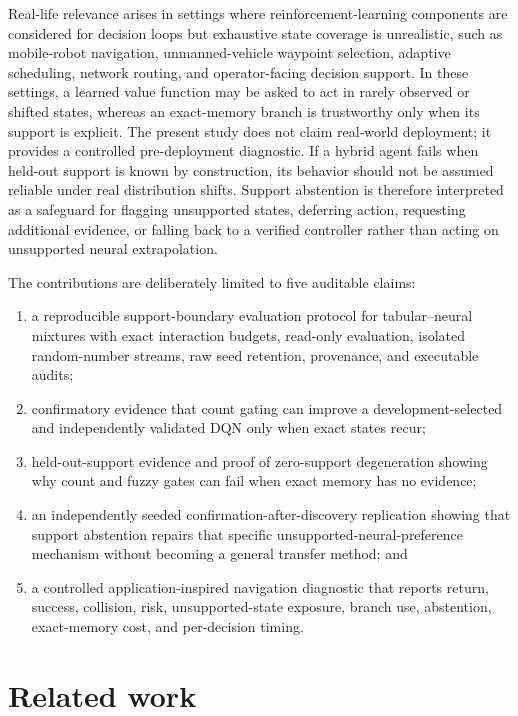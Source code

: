\documentclass[preprint,12pt]{elsarticle}
\begin{document}
Real-life relevance arises in settings where reinforcement-learning components
are considered for decision loops but exhaustive state coverage is unrealistic,
such as mobile-robot navigation, unmanned-vehicle waypoint selection, adaptive
scheduling, network routing, and operator-facing decision support. In these
settings, a learned value function may be asked to act in rarely observed or
shifted states, whereas an exact-memory branch is trustworthy only when its
support is explicit. The present study does not claim real-world deployment;
it provides a controlled pre-deployment diagnostic. If a hybrid agent fails
when held-out support is known by construction, its behavior should not be
assumed reliable under real distribution shifts. Support abstention is therefore
interpreted as a safeguard for flagging unsupported states, deferring action,
requesting additional evidence, or falling back to a verified controller rather
than acting on unsupported neural extrapolation.

The contributions are deliberately limited to five auditable claims:
\begin{enumerate}
  \item a reproducible support-boundary evaluation protocol for tabular--neural
  mixtures with exact interaction budgets, read-only evaluation, isolated
  random-number streams, raw seed retention, provenance, and executable audits;
  \item confirmatory evidence that count gating can improve a
  development-selected and independently validated DQN only when exact states
  recur;
  \item held-out-support evidence and proof of zero-support degeneration showing
  why count and fuzzy gates can fail when exact memory has no evidence;
  \item an independently seeded confirmation-after-discovery replication showing
  that support abstention repairs that specific unsupported-neural-preference
  mechanism without becoming a general transfer method; and
  \item a controlled application-inspired navigation diagnostic that reports
  return, success, collision, risk, unsupported-state exposure, branch use,
  abstention, exact-memory cost, and per-decision timing.
\end{enumerate}

\section{Related work}
\label{sec:related}
\end{document}
